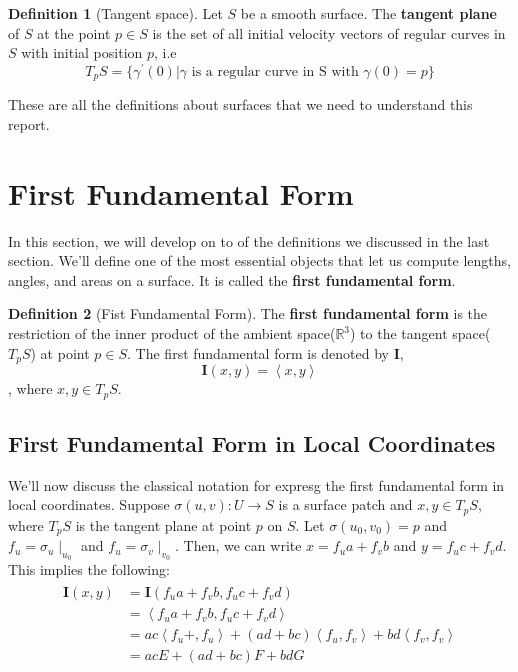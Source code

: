 \documentclass{article}
\theoremstyle{plain}
\theoremstyle{definition}
\newtheorem{definition}{Definition}
\theoremstyle{remark}
\newcommand{\R}{\mathbb{R}}
\begin{document}
\begin{definition}[Tangent space]
    Let \(S\) be a smooth surface. The \textbf{tangent plane} of \(S\) at the point \( p \in S\) is the set of all initial velocity vectors of regular curves in \(S\) with initial position \(p\), i.e \[ T_pS = \{ \gamma^\prime(0) | \gamma \text{ is a regular curve in S with }\gamma(0) = p\} \]
\end{definition}

These are all the definitions about surfaces that we need to understand this report.

\section{First Fundamental Form}
In this section, we will develop on to of the definitions we discussed in the last section. We'll define one of the most essential objects that let us compute lengths, angles, and areas on a surface. It is called the \textbf{first fundamental form}.

\begin{definition}[Fist Fundamental Form]
    The \textbf{first fundamental form} is the restriction of the inner product of the ambient space(\(\R^3\)) to the tangent space(\( T_pS\)) at point \( p \in S\). The first fundamental form is denoted by \( \mathbf{I} \), \[ \mathbf{I}(x,y) = \left\langle x,y\right\rangle  \], where \( x,y \in T_pS\).
\end{definition}

\subsection{First Fundamental Form in Local Coordinates} \label{ssec: The first fundamental form in local coordinates}
We'll now discuss the classical notation for expresg the first fundamental form in local coordinates. Suppose \( \sigma(u,v): U \rightarrow S\) is a surface patch and \( x,y \in T_pS \), where \(T_pS\) is the tangent plane at point \(p\) on \(S\). Let \( \sigma(u_0, v_0) = p \) and \( f_u = \sigma_u \mid_{u_0} \) and \( f_u = \sigma_v \mid_{v_0} \). Then, we can write \(x =  f_u a + f_v b\) and \( y =  f_u c + f_v d\). This implies the following:
\begin{align}
    \begin{split}
        \mathbf{I}(x,y) & = \mathbf{I}( f_u a + f_v b,  f_u c + f_v d) \\
        & = \left\langle f_u a + f_v b,  f_u c + f_v d \right\rangle \\
        & = ac\left\langle  f_u  +,  f_u  \right\rangle + (ad+bc)\left\langle  f_u  , f_v  \right\rangle + bd \left\langle f_v , f_v  \right\rangle \\
        & = ac E + (ad+bc)F + bd G
    \end{split}
\end{align}
\end{document}
